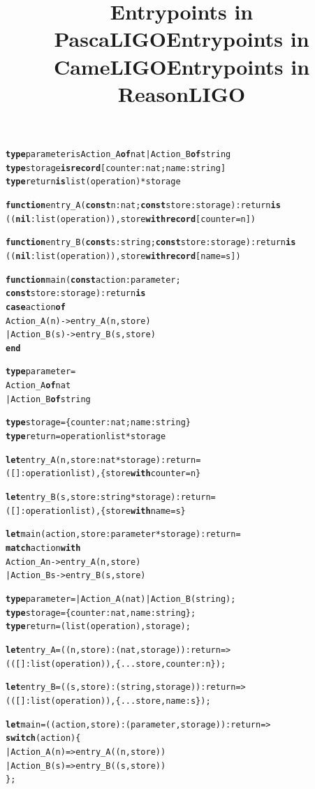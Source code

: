 \documentclass[wide]{slides}
\newcommand{\Kcase}[0]{\textbf{case}\xspace}
\newcommand{\Kconst}[0]{\textbf{const}\xspace}
\newcommand{\Kend}[0]{\textbf{end}\xspace}
\newcommand{\Kfunction}[0]{\textbf{function}\xspace}
\newcommand{\Kis}[0]{\textbf{is}\xspace}
\newcommand{\Knil}[0]{\textbf{nil}\xspace}
\newcommand{\Kof}[0]{\textbf{of}\xspace}
\newcommand{\Krecord}[0]{\textbf{record}\xspace}
\newcommand{\Ktype}[0]{\textbf{type}\xspace}
\newcommand{\Kwith}[0]{\textbf{with}\xspace}
\newcommand{\Klet}[0]{\textbf{let}\xspace}
\newcommand{\Kmatch}[0]{\textbf{match}\xspace}
\newcommand{\Kswitch}[0]{\textbf{switch}\xspace}
\begin{document}
\begin{slide}
  \title{Entrypoints in PascaLIGO}

      \begin{alltt}
\Ktype parameter is Action_A \Kof nat | Action_B \Kof string
\Ktype storage \Kis \Krecord [counter : nat; name : string]
\Ktype return \Kis list (operation) * storage

\Kfunction entry_A (\Kconst n : nat; \Kconst store : storage) : return \Kis
  ((\Knil : list (operation)), store \Kwith \Krecord [counter = n])

\Kfunction entry_B (\Kconst s : string; \Kconst store : storage) : return \Kis
  ((\Knil : list (operation)), store \Kwith \Krecord [name = s])

\Kfunction main (\Kconst action : parameter;
                  \Kconst store : storage) : return \Kis
  \Kcase action \Kof
    Action_A (n) -> entry_A (n, store)
  | Action_B (s) -> entry_B (s, store)
  \Kend
      \end{alltt}

\end{slide}

\begin{slide}
  \title{Entrypoints in CameLIGO}

  \begin{alltt}
\Ktype parameter =
  Action_A \Kof nat
| Action_B \Kof string

\Ktype storage = \{counter : nat; name : string\}
\Ktype return = operation list * storage

\Klet entry_A (n, store : nat * storage) : return =
  ([] : operation list), \{store \Kwith counter = n\}

\Klet entry_B (s, store : string * storage) : return =
  ([] : operation list), \{store \Kwith name = s\}

\Klet main (action, store : parameter * storage) : return =
  \Kmatch action \Kwith
    Action_A n -> entry_A (n, store)
  | Action_B s -> entry_B (s, store)
  \end{alltt}

\end{slide}

\begin{slide}
  \title{Entrypoints in ReasonLIGO}

  \begin{alltt}
\Ktype parameter = | Action_A (nat) | Action_B (string);
\Ktype storage = \{counter : nat, name : string\};
\Ktype return = (list (operation), storage);

\Klet entry_A = ((n, store) : (nat, storage)) : return =>
  (([] : list (operation)), \{...store, counter : n\});

\Klet entry_B = ((s, store) : (string, storage)) : return =>
  (([] : list (operation)), \{...store, name : s\});

\Klet main = ((action, store) : (parameter, storage)) : return =>
  \Kswitch (action) \{
  | Action_A (n) => entry_A ((n, store))
  | Action_B (s) => entry_B ((s, store))
  \};
  \end{alltt}

\end{slide}
\end{document}
